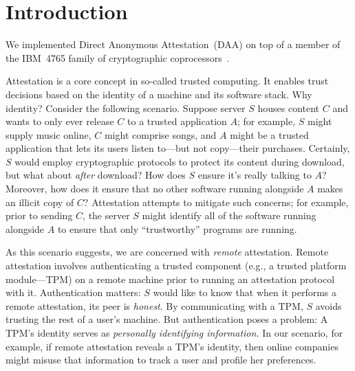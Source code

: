 \section{Introduction}

\begin{comment}
	\emph{PDS:}
	Our goal is to motivate and sketch out our work.
	
	At the moment, I've simply dropped in a copy of our proposal.
	Even if those ideas suffice, we clearly need to adjust the text since
	we're now talking about what we have done rather
	than what we propose to do.
	
	Let's consider improving the ideas.
	
	I want to move away from
	TCG-style attestation to the more general problem of
	\emph{authenticating a remote application}.
	Identifying
	all of the software running on a machine may well uniquely
	identify the machine.
	Authentication without inherently leaking identity enables
	attestation. What other protocols does it enable?
	Voting protocols?
\end{comment}
\fi

We implemented Direct Anonymous Attestation~(DAA) on top of
a member of the IBM~4765 family of
cryptographic coprocessors~\cite{daa,smith:design}.

Attestation is a core concept in so-called trusted computing.
It enables trust decisions based on the identity of a machine
and its software stack.
Why identity?
Consider the following scenario.
Suppose server $S$ houses content $C$ and wants to
only ever release $C$ to a trusted application $A$;
for example, $S$ might supply music online,
$C$ might comprise songs,
and $A$ might be a trusted application that
lets its users listen to---but not copy---their purchases.
Certainly, $S$ would employ cryptographic protocols to protect
its content during download, but what about \emph{after} download?
How does $S$ ensure it's really talking to $A$? Moreover, how does
it ensure that no other software running alongside $A$ makes an illicit
copy of $C$?
Attestation attempts to mitigate such concerns; for example,
prior to sending $C$, the server $S$ might identify all of the
software running alongside $A$ to ensure that only ``trustworthy'' programs
are running.

As this scenario suggests, we are concerned with \emph{remote} attestation.
Remote attestation involves authenticating a trusted component (e.g., a trusted platform module---TPM)
on a remote machine prior to running an attestation protocol
with it.
Authentication matters: $S$ would like to know that when it performs a remote attestation,
its peer is \emph{honest}.
By communicating with a TPM, $S$ avoids trusting
the rest of a user's machine.
But authentication poses a problem: A TPM's identity serves as
\emph{personally identifying information.}
In our scenario, for example, if remote attestation reveals a TPM's identity, then
online companies might misuse that information to track a user and profile
her preferences.

